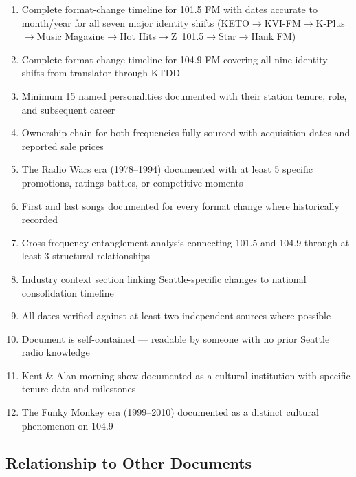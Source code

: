 \documentclass[11pt,letterpaper]{article}
\begin{document}
\begin{enumerate}[leftmargin=2em]
\item Complete format-change timeline for 101.5 FM with dates accurate to month/year for all seven major identity shifts (KETO$\rightarrow$KVI-FM$\rightarrow$K-Plus$\rightarrow$Music Magazine$\rightarrow$Hot Hits$\rightarrow$Z~101.5$\rightarrow$Star$\rightarrow$Hank FM)
\item Complete format-change timeline for 104.9 FM covering all nine identity shifts from translator through KTDD
\item Minimum 15 named personalities documented with their station tenure, role, and subsequent career
\item Ownership chain for both frequencies fully sourced with acquisition dates and reported sale prices
\item The Radio Wars era (1978--1994) documented with at least 5 specific promotions, ratings battles, or competitive moments
\item First and last songs documented for every format change where historically recorded
\item Cross-frequency entanglement analysis connecting 101.5 and 104.9 through at least 3 structural relationships
\item Industry context section linking Seattle-specific changes to national consolidation timeline
\item All dates verified against at least two independent sources where possible
\item Document is self-contained --- readable by someone with no prior Seattle radio knowledge
\item Kent \& Alan morning show documented as a cultural institution with specific tenure data and milestones
\item The Funky Monkey era (1999--2010) documented as a distinct cultural phenomenon on 104.9
\end{enumerate}

\subsection{Relationship to Other Documents}
\end{document}
